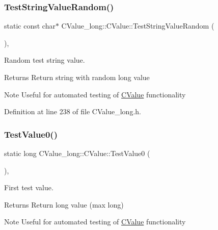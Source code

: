 \subsubsection{\texorpdfstring{Test\+String\+Value\+Random()}{TestStringValueRandom()}}
{\footnotesize\ttfamily static const char$\ast$ C\+Value\+\_\+long\+::\+C\+Value\+::\+Test\+String\+Value\+Random (\begin{DoxyParamCaption}{ }\end{DoxyParamCaption})\hspace{0.3cm}{\ttfamily [inline]}, {\ttfamily [static]}}



Random test string value. 

\begin{DoxyReturn}{Returns}
Return string with random {\ttfamily long} value 
\end{DoxyReturn}
\begin{DoxyNote}{Note}
Useful for automated testing of \hyperlink{class_c_value__long_1_1_c_value}{C\+Value} functionality 
\end{DoxyNote}


Definition at line 238 of file C\+Value\+\_\+long.\+h.

\mbox{\label{class_c_value__long_1_1_c_value_a9da78b54b0afa6d29da214512c0e577e}} 
\subsubsection{\texorpdfstring{Test\+Value0()}{TestValue0()}}
{\footnotesize\ttfamily static long C\+Value\+\_\+long\+::\+C\+Value\+::\+Test\+Value0 (\begin{DoxyParamCaption}{ }\end{DoxyParamCaption})\hspace{0.3cm}{\ttfamily [inline]}, {\ttfamily [static]}}



First test value. 

\begin{DoxyReturn}{Returns}
Return {\ttfamily long} value ({\ttfamily max} long) 
\end{DoxyReturn}
\begin{DoxyNote}{Note}
Useful for automated testing of \hyperlink{class_c_value__long_1_1_c_value}{C\+Value} functionality 
\end{DoxyNote}


